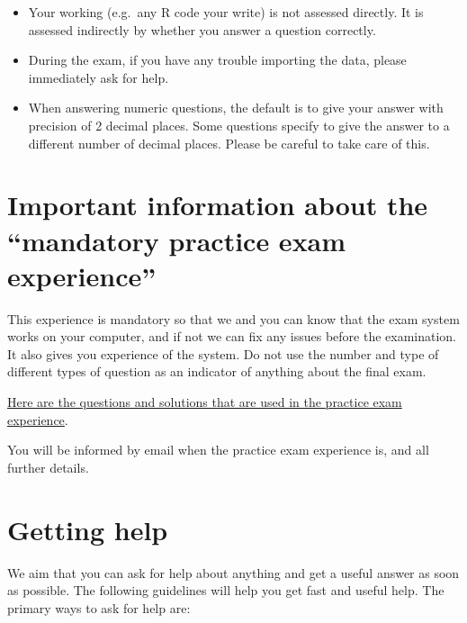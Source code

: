 \documentclass[
  letterpaper,
  8pt,
  a4paper]{book}
\begin{document}
\begin{itemize}
  during the exam, so please ensure that you can do things like
  importing data quickly and easily.
\item
  Your working (e.g.~any R code your write) is not assessed directly. It
  is assessed indirectly by whether you answer a question correctly.
\item
  During the exam, if you have any trouble importing the data, please
  immediately ask for help.
\item
  When answering numeric questions, the default is to give your answer
  with precision of 2 decimal places. Some questions specify to give the
  answer to a different number of decimal places. Please be careful to
  take care of this.
\end{itemize}

\section*{Important information about the ``mandatory practice exam
experience''}\label{important-information-about-the-mandatory-practice-exam-experience}


This experience is mandatory so that we and you can know that the exam
system works on your computer, and if not we can fix any issues before
the examination. It also gives you experience of the system. Do not use
the number and type of different types of question as an indicator of
anything about the final exam.

\href{https://github.com/opetchey/BIO144/raw/master/2_content/xtras/BIO144_exam_preparation_solutions.pdf}{Here
are the questions and solutions that are used in the practice exam
experience}.

You will be informed by email when the practice exam experience is, and
all further details.

\section*{Getting help}\label{getting-help}


We aim that you can ask for help about anything and get a useful answer
as soon as possible. The following guidelines will help you get fast and
useful help. The primary ways to ask for help are:
\end{document}
